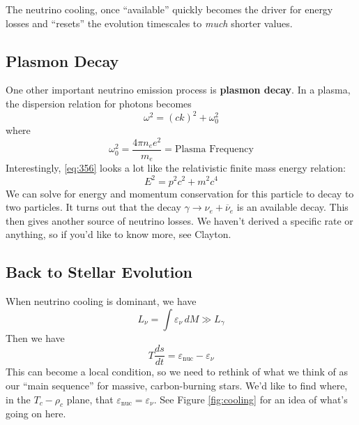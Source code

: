 \documentclass[10pt]{article}
\numberwithin{equation}{section}
\newcommand{\figref}[1]{Figure \ref{#1}}
\begin{document}
    The neutrino cooling, once ``available'' quickly becomes the
    driver for energy losses and ``resets'' the evolution timescales
    to \emph{much} shorter values.

    \subsection{Plasmon Decay}
    \label{sec:plasmon-decay}

   One other important neutrino emission process is \textbf{plasmon
      decay}. In a plasma, the dispersion relation for photons becomes
    \begin{equation}
      \label{eq:356}
      \omega^2=(ck)^2+\omega_0^2
    \end{equation}
    where 
    \begin{equation}
      \label{eq:357}
      \omega_0^2=\frac{4\pi n_e e^2}{m_e}=\textrm{Plasma Frequency}
    \end{equation}
    Interestingly, \eqref{eq:356} looks a lot like the relativistic
    finite mass energy relation:
    \begin{equation}
      \label{eq:358}
      E^2=p^2c^2+m^2 c^4
    \end{equation}
    We can solve for energy and momentum conservation for this particle
    to decay to two particles. It turns out that the decay $\gamma\to
    \nu_e + \overline{\nu}_e$ is an available decay. This then gives
    another source of neutrino losses. We haven't derived a specific
    rate or anything, so if you'd like to know more, see Clayton.

    \subsection{Back to Stellar Evolution}
    \label{sec:back-stell-evol}

    When neutrino cooling is dominant, we have
    \begin{equation}
      \label{eq:359}
      L_\nu=\int \varepsilon_\nu\,dM\gg L_\gamma
    \end{equation}
    Then we have
    \begin{equation}
      \label{eq:360}
      T\frac{ds}{dt}=\varepsilon_{\mathrm{nuc}}-\varepsilon_\nu
    \end{equation}
    This can become a local condition, so we need to rethink of what
    we think of as our ``main sequence'' for massive, carbon-burning
    stars. We'd like to find where, in the $T_c-\rho_c$ plane, that
    $\varepsilon_{\mathrm{nuc}}=\varepsilon_\nu$. See
    \figref{fig:cooling} for an idea of what's going on here.\\
\end{document}
